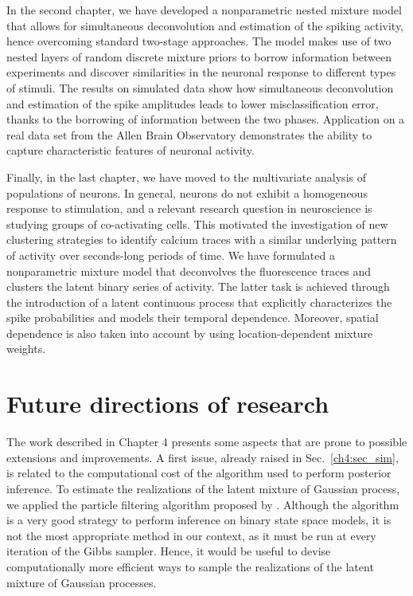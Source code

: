 In the second chapter, we have developed a nonparametric nested mixture model that allows for simultaneous deconvolution and estimation of the spiking activity, hence overcoming standard two-stage approaches.
The model makes use of two nested layers of random discrete mixture priors to borrow information between experiments and discover similarities in the neuronal response to different types of stimuli. 
The results on simulated data show how simultaneous deconvolution and estimation of the spike amplitudes leads to lower misclassification error, thanks to the borrowing of information between the two phases. Application on a real data set from the Allen Brain Observatory demonstrates the ability to capture characteristic features of neuronal activity.

Finally, in the last chapter, we have moved to the multivariate analysis of populations of neurons. In general, neurons do not exhibit a homogeneous response to stimulation, and a relevant research question in neuroscience is studying groups of co-activating cells.
This motivated the investigation of new clustering strategies to identify calcium traces with a similar underlying pattern of activity over seconds-long periods of time.
We have formulated a nonparametric mixture model that deconvolves the fluorescence traces and clusters the latent binary series of activity. The latter task is achieved through the introduction of a latent continuous process that explicitly characterizes the spike probabilities and models their temporal dependence. Moreover, spatial dependence is also taken into account by using location-dependent mixture weights.

\section*{Future directions of research}

The work described in Chapter 4 presents some aspects that are prone to possible extensions and improvements. A first issue, already raised in Sec.~\ref{ch4:sec_sim}, is related to the computational cost of the algorithm used to perform posterior inference. To estimate the realizations of the latent mixture of Gaussian process, we applied the particle filtering algorithm proposed by \textcite{fasano2021}. Although the algorithm is a very good strategy to perform inference on binary state space models, it is not the most appropriate method in our context, as it must be run at every iteration of the Gibbs sampler. Hence, it would be useful to devise computationally more efficient ways to sample the realizations of the latent mixture of Gaussian processes.


